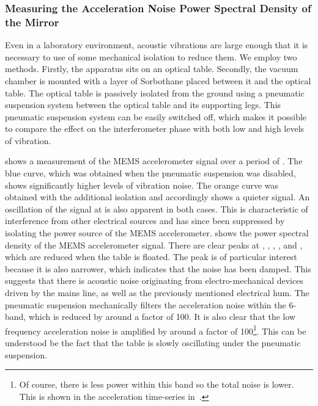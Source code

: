 \subsubsection{Measuring the Acceleration Noise Power Spectral Density
of the Mirror}
Even in a laboratory environment, acoustic
vibrations are large enough that it is necessary to use of some
mechanical isolation to reduce them.
We employ two methods. Firstly, the apparatus sits on an optical
table. Secondly, the vacuum
chamber is mounted with a layer of Sorbothane placed between it and the optical
table. The optical table is passively isolated
from the ground using a pneumatic suspension system between the optical table and its
supporting legs. This pneumatic suspension system can be easily
switched off, which makes it possible to compare the effect on the
interferometer phase 
with both low and high levels of vibration.
\par\noindent
{} shows a measurement of the MEMS
accelerometer signal over a period of . The blue curve,
which was obtained when the pneumatic suspension was disabled, shows
significantly higher levels of vibration noise. The orange curve was
obtained with the additional isolation and accordingly shows a quieter
signal. An oscillation of the
signal at  is also apparent in both cases. This is
characteristic of interference from other electrical sources and has
since been suppressed by isolating the power source of the MEMS
accelerometer. 
shows the power spectral density of the MEMS accelerometer signal.
There are clear peaks at , ,
, ,  and
, which are reduced when the table is floated. The
 peak is of particular interest because it is also
narrower, which indicates that the noise has been damped. This
suggests that there is acoustic noise originating from electro-mechanical devices
driven by the  mains line, as well as the previously
mentioned electrical hum. 
The pneumatic suspension mechanically filters the acceleration noise within the 6-
band, which is reduced by around a factor of 100. It is also clear that the low frequency
acceleration noise is amplified by around a factor of 100\footnote{Of
  course, there is less power within this band so the total noise is
  lower. This is shown in the acceleration time-series
in~.}. This can be understood be the fact
that the table is slowly oscillating under the pneumatic suspension.
